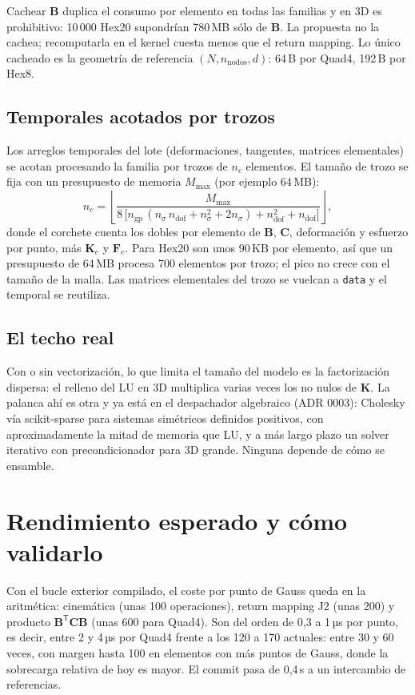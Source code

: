 \documentclass[11pt,letterpaper,oneside]{article}
\newcommand{\code}[1]{\texttt{#1}}
\begin{document}
Cachear $\mathbf B$ duplica el consumo por elemento en todas las familias y en 3D es prohibitivo: 10\,000 Hex20 supondrían 780\,MB sólo de $\mathbf B$. La propuesta no la cachea; recomputarla en el kernel cuesta menos que el return mapping. Lo único cacheado es la geometría de referencia $(N, n_{\text{nodos}}, d)$: 64\,B por Quad4, 192\,B por Hex8.

\subsection{Temporales acotados por trozos}

Los arreglos temporales del lote (deformaciones, tangentes, matrices elementales) se acotan procesando la familia por trozos de $n_c$ elementos. El tamaño de trozo se fija con un presupuesto de memoria $M_{\max}$ (por ejemplo 64\,MB):
\begin{equation}
  n_c = \left\lfloor \frac{M_{\max}}{8\,\bigl[n_{\text{gp}}\,(n_\sigma\, n_{\text{dof}} + n_\sigma^2 + 2 n_\sigma) + n_{\text{dof}}^2 + n_{\text{dof}}\bigr]} \right\rfloor ,
\end{equation}
donde el corchete cuenta los dobles por elemento de $\mathbf B$, $\mathbf C$, deformación y esfuerzo por punto, más $\mathbf K_e$ y $\mathbf F_e$. Para Hex20 son unos 90\,KB por elemento, así que un presupuesto de 64\,MB procesa 700 elementos por trozo; el pico no crece con el tamaño de la malla. Las matrices elementales del trozo se vuelcan a \code{data} y el temporal se reutiliza.

\subsection{El techo real}

Con o sin vectorización, lo que limita el tamaño del modelo es la factorización dispersa: el relleno del LU en 3D multiplica varias veces los no nulos de $\mathbf K$. La palanca ahí es otra y ya está en el despachador algebraico (ADR 0003): Cholesky vía scikit-sparse para sistemas simétricos definidos positivos, con aproximadamente la mitad de memoria que LU, y a más largo plazo un solver iterativo con precondicionador para 3D grande. Ninguna depende de cómo se ensamble.

\section{Rendimiento esperado y cómo validarlo}

Con el bucle exterior compilado, el coste por punto de Gauss queda en la aritmética: cinemática (unas 100 operaciones), return mapping J2 (unas 200) y producto $\mathbf B^{\mathsf T}\mathbf C\mathbf B$ (unas 600 para Quad4). Son del orden de 0,3 a 1\,µs por punto, es decir, entre 2 y 4\,µs por Quad4 frente a los 120 a 170 actuales: entre 30 y 60 veces, con margen hasta 100 en elementos con más puntos de Gauss, donde la sobrecarga relativa de hoy es mayor. El commit pasa de 0,4\,s a un intercambio de referencias.
\end{document}

